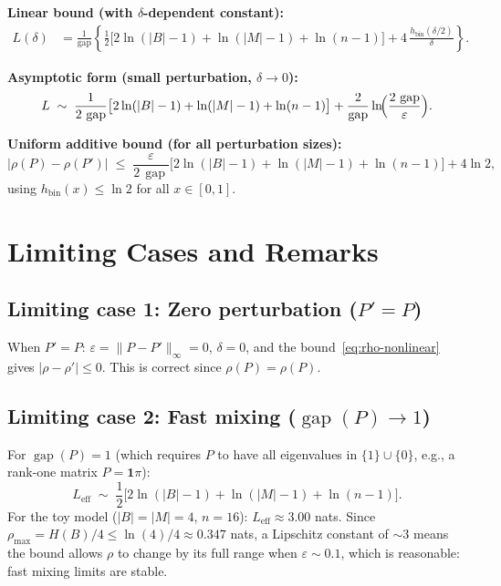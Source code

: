 \documentclass[11pt]{article}
\DeclareMathOperator{\gap}{gap}
\begin{document}
\noindent
\textbf{Linear bound (with $\delta$-dependent constant):}
\begin{align}
  L(\delta) &= \frac{1}{\gap}\left\{
    \frac{1}{2}\bigl[2\ln(|B|-1) + \ln(|M|-1) + \ln(n-1)\bigr]
    + 4\,\frac{h_{\mathrm{bin}}(\delta/2)}{\delta}
  \right\}. \label{eq:L-collected}
\end{align}

\noindent
\textbf{Asymptotic form (small perturbation, $\delta \to 0$):}
\begin{equation}\label{eq:L-asymptotic}
  L \;\sim\; \frac{1}{2\,\gap}\bigl[2\ln(|B|-1) + \ln(|M|-1) + \ln(n-1)\bigr]
  + \frac{2}{\gap}\ln\!\Bigl(\frac{2\,\gap}{\varepsilon}\Bigr).
\end{equation}

\noindent
\textbf{Uniform additive bound (for all perturbation sizes):}
\begin{equation}\label{eq:uniform}
  |\rho(P) - \rho(P')| \;\le\;
  \frac{\varepsilon}{2\,\gap}\bigl[2\ln(|B|-1) + \ln(|M|-1) + \ln(n-1)\bigr]
  + 4\ln 2,
\end{equation}
using $h_{\mathrm{bin}}(x) \le \ln 2$ for all $x \in [0,1]$.

\section{Limiting Cases and Remarks}

\subsection{Limiting case 1: Zero perturbation ($P' = P$)}

When $P' = P$: $\varepsilon = \|P - P'\|_\infty = 0$, $\delta = 0$,
and the bound~\eqref{eq:rho-nonlinear} gives $|\rho - \rho'| \le 0$.
This is correct since $\rho(P) = \rho(P)$.

\subsection{Limiting case 2: Fast mixing ($\gap(P) \to 1$)}

For $\gap(P) = 1$ (which requires $P$ to have all eigenvalues in
$\{1\} \cup \{0\}$, e.g., a rank-one matrix $P = \mathbf{1}\pi$):
\[
  L_{\text{eff}} \;\sim\; \frac{1}{2}\bigl[2\ln(|B|-1) + \ln(|M|-1) + \ln(n-1)\bigr].
\]
For the toy model ($|B| = |M| = 4$, $n = 16$):
$L_{\text{eff}} \approx 3.00$ nats.  Since $\rho_{\max} = H(B)/4
\le \ln(4)/4 \approx 0.347$ nats, a Lipschitz constant of $\sim 3$ means
the bound allows $\rho$ to change by its full range when
$\varepsilon \sim 0.1$, which is reasonable: fast mixing limits are stable.
\end{document}
